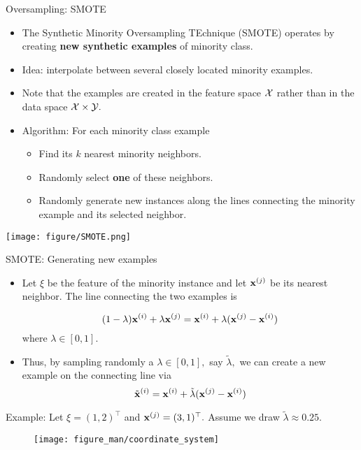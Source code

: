 \documentclass[11pt,compress,t,notes=noshow, xcolor=table]{beamer}
\begin{document}
	\begin{frame}{Oversampling: SMOTE}
		\footnotesize
		\begin{itemize}
			\item The Synthetic Minority Oversampling TEchnique (SMOTE) operates by creating \textbf{new synthetic examples} of minority class.

			\item Idea: interpolate between several closely located minority examples.

			\item Note that the examples are created in the feature space $\mathcal{X}$ rather than in the data space $\mathcal{X}\times\mathcal{Y}.$
	
			\item Algorithm: For each minority class example 

			\begin{itemize} 
                \footnotesize

				\item Find its $k$ nearest minority neighbors.
		
				\item Randomly select \textbf{one} of these neighbors.
		
				\item Randomly generate new instances along the lines connecting the minority example and its selected neighbor.
		
			\end{itemize}

		\end{itemize}
%	
		\texttt{[image: figure/SMOTE.png]} 
	\end{frame}
	
	\begin{frame}{SMOTE: Generating new examples}
		\footnotesize
		
			\begin{itemize}
	
				\item Let $\xi$ be the feature of the minority instance and let $\mathbf{x}^{(j)}$ be its nearest neighbor. The line connecting the two examples is
				
				$$		(1-\lambda) \mathbf{x}^{(i)} + \lambda\mathbf{x}^{(j)} = \mathbf{x}^{(i)} + \lambda(\mathbf{x}^{(j)} - \mathbf{x}^{(i)})	$$
%				
				where $\lambda \in [0,1].$
				\item Thus, by sampling randomly a $\lambda \in [0,1],$ say $\tilde{\lambda},$ we can create a new example on the connecting line via
%				
				$$   \tilde{\mathbf{x}}^{(i)} =  \mathbf{x}^{(i)} + \tilde{\lambda}(\mathbf{x}^{(j)} - \mathbf{x}^{(i)})	 $$
			\end{itemize}		
				
				Example: Let $\xi = (1,2)^\top$ and $\mathbf{x}^{(j)} = (3,1)^\top.$ Assume we draw $\tilde{\lambda} \approx 0.25.$
			\begin{figure}
				\centering
				\texttt{[image: figure\_man/coordinate\_system]}
			\end{figure}
		
	\end{frame}
\end{document}
